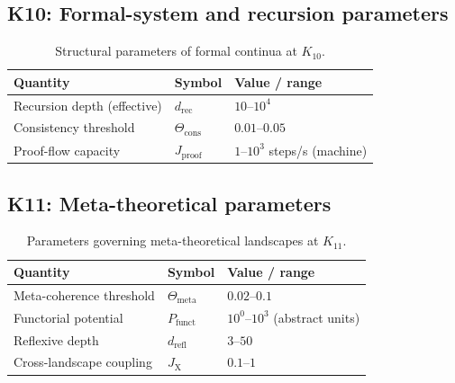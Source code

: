 
\subsection*{K10: Formal-system and recursion parameters}

\begin{table}[htbp]
  \centering
  \caption{Structural parameters of formal continua at \(K_{10}\).}
  \label{tab:k10-formal-parameters}
  \begin{tabular}{@{}L{0.44\textwidth}L{0.16\textwidth}L{0.23\textwidth}@{}}
    \hline
    Quantity & Symbol & Value / range \\
    \hline
    Recursion depth (effective) & \(d_\mathrm{rec}\)
        & \(10\text{–}10^4\) \\
    Consistency threshold & \(\Theta_\mathrm{cons}\)
        & \(0.01\text{–}0.05\) \\
    Proof-flow capacity & \(J_\mathrm{proof}\)
        & \(1\text{–}10^3\) steps/s (machine) \\
    \hline
  \end{tabular}
\end{table}


\subsection*{K11: Meta-theoretical parameters}

\begin{table}[htbp]
  \centering
  \caption{Parameters governing meta-theoretical landscapes at \(K_{11}\).}
  \label{tab:k11-meta-parameters}
  \begin{tabular}{@{}L{0.44\textwidth}L{0.16\textwidth}L{0.23\textwidth}@{}}
    \hline
    Quantity & Symbol & Value / range \\
    \hline
    Meta-coherence threshold & \(\Theta_\mathrm{meta}\)
        & \(0.02\text{–}0.1\) \\
    Functorial potential & \(P_\mathrm{funct}\)
        & \(10^0\text{–}10^3\) (abstract units) \\
    Reflexive depth & \(d_\mathrm{refl}\)
        & \(3\text{–}50\) \\
    Cross-landscape coupling & \(J_\mathrm{X}\)
        & \(0.1\text{–}1\) \\
    \hline
  \end{tabular}
\end{table}

